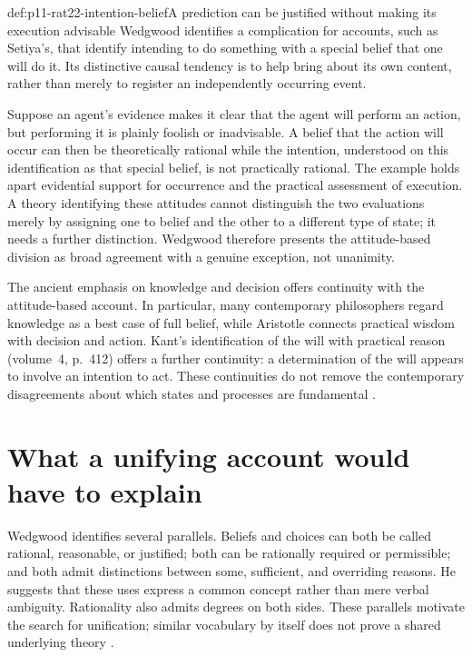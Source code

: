 \begin{hbexample}{def:p11-rat22-intention-belief}{A prediction can be justified without making its execution advisable}
Wedgwood identifies a complication for accounts, such as Setiya's, that
identify intending to do something with a special belief that one will do
it. Its distinctive causal tendency is to help bring about its own content,
rather than merely to register an independently occurring event.

Suppose an agent's evidence makes it clear that the agent will perform an
action, but performing it is plainly foolish or inadvisable. A belief that
the action will occur can then be theoretically rational while the
intention, understood on this identification as that special belief, is
not practically rational. The example holds apart evidential support for
occurrence and the practical assessment of execution. A theory identifying
these attitudes cannot distinguish the two evaluations merely by assigning
one to belief and the other to a different type of state; it needs a
further distinction. Wedgwood therefore presents the attitude-based
division as broad agreement with a genuine exception, not unanimity.
\end{hbexample}

The ancient emphasis on knowledge and decision offers continuity with
the attitude-based account. In particular, many contemporary philosophers
regard knowledge as a best case of full belief, while Aristotle connects
practical wisdom with decision and action. Kant's identification of the
will with practical reason (volume~4, p.~412) offers a further continuity:
a determination of the will appears to involve an intention to act.
These continuities do not remove the contemporary disagreements about
which states and processes are fundamental
\parencite[pp.~138--139]{RalphWedgwood2021}.

\section{What a unifying account would have to explain}
\label{sec:p11-rat22-unification}

Wedgwood identifies several parallels. Beliefs and choices can both be
called rational, reasonable, or justified; both can be rationally required
or permissible; and both admit distinctions between some, sufficient,
and overriding reasons. He suggests that these uses express a common
concept rather than mere verbal ambiguity. Rationality also admits
degrees on both sides. These parallels motivate the search for unification;
similar vocabulary by itself does not prove a shared underlying theory
\parencite[pp.~139--140]{RalphWedgwood2021}.

